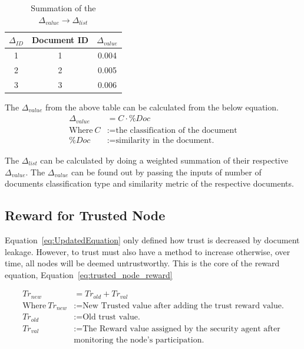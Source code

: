 \begin{table}[h!]
    \centering
    \begin{tabular}{c | c | c}
        \hline
        \(\Delta_{ID} \) & Document ID & \(\Delta_{value}\) \\
        \hline \hline
        1 & 1 & 0.004 \\
        2 & 2 & 0.005 \\
        3 & 3 & 0.006 \\
    \end{tabular}
    \caption{Summation of the \(\Delta_{value} \to \Delta_{list}\)}
    \label{tab:summation_value_calculation}
\end{table}

The \(\Delta_{value}\) from the above table can be calculated from the below equation.
\begin{equation}
    \begin{aligned}
    \Delta_{value} &= C \cdot \%Doc \\
    \text{Where}~C &:= \text{the classification of the document} \\
    \%Doc &:= \text{similarity in the document.}
\end{aligned}
\end{equation}

The \( \Delta_{list} \) can be calculated by doing a weighted summation of
their respective \( \Delta_{value} \). The \( \Delta_{value} \) can be found
out by passing the inputs of number of documents classification type and
similarity metric of the respective documents.

\subsection{Reward for Trusted Node}
Equation~\ref{eq:UpdatedEquation} only defined how trust is decreased by
document leakage. However, to trust must also have a method to increase
otherwise, over time, all nodes will be deemed untrustworthy. This is the core
of the reward equation, Equation~\ref{eq:trusted_node_reward}

\begin{equation}
    \label{eq:trusted_node_reward}
    \begin{aligned}
    Tr_{new} &= Tr_{old} + Tr_{val} \\
    \text{Where}~Tr_{new} &:= \text{New Trusted value after adding the trust reward value.} \\
    Tr_{old} &:= \text{Old trust value.} \\
    Tr_{val} &:= \text{The Reward value assigned by the security agent after}\\
                 &\text{monitoring the node's participation.}
\end{aligned}
\end{equation}

